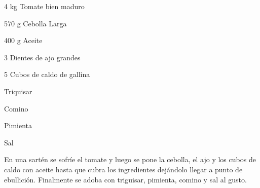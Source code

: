 \label{hogo}


\begin{ingredientes}
\item 4 kg Tomate bien maduro
\item 570 g Cebolla Larga
\item 400 g Aceite
\item 3 Dientes de ajo grandes
\item 5 Cubos de caldo de gallina
\item Triquisar
\item Comino
\item Pimienta
\item Sal
\end{ingredientes}
\preparacion
En una sartén se sofríe el tomate y luego se pone la cebolla, el ajo y los cubos de caldo con aceite hasta que cubra los ingredientes dejándolo llegar a punto de ebullición. Finalmente se adoba con triguisar, pimienta, comino y sal al gusto.


